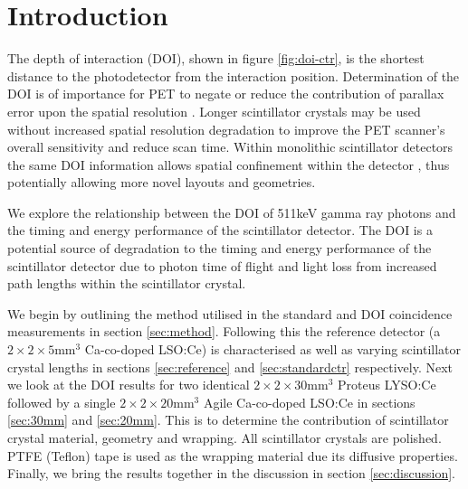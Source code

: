 \section{Introduction} 
The depth of interaction (DOI), shown in figure \ref{fig:doi-ctr}, is the shortest distance to the photodetector from the interaction position. Determination of the DOI is of importance for PET to negate or reduce the contribution of parallax error upon the spatial resolution \cite{Moses_2001}\cite{Humm_Rosenfeld_Del_Guerra_2003}. Longer scintillator crystals may be used without increased spatial resolution degradation to improve the PET scanner's overall sensitivity and reduce scan time. Within monolithic scintillator detectors the same DOI information allows spatial confinement within the detector \cite{am_Borghi_Seifert_Schaart_2013}\cite{Maas_Bruyndonckx_Schaart_2012}, thus potentially allowing more novel\cite{Dendooven_Lohner_Beekman_2009}\cite{n_der_Lei_van_Dam_Schaart_2013} layouts and geometries.

We explore the relationship between the DOI of 511keV gamma ray photons and the timing and energy performance of the scintillator detector. The DOI is a potential source of degradation to the timing and energy performance of the scintillator detector due to photon time of flight and light loss from increased path lengths within the scintillator crystal.

We begin by outlining the method utilised in the standard and DOI coincidence measurements in section \ref{sec:method}. Following this the reference detector (a $2\times2\times5$mm$^3$ Ca-co-doped LSO:Ce) is characterised as well as varying scintillator crystal lengths in sections \ref{sec:reference} and \ref{sec:standardctr} respectively. Next we look at the DOI results for two identical $2\times2\times30$mm$^3$ Proteus LYSO:Ce followed by a single $2\times2\times20$mm$^3$ Agile Ca-co-doped LSO:Ce in sections \ref{sec:30mm} and \ref{sec:20mm}. This is to determine the contribution of scintillator crystal material, geometry and wrapping. All scintillator crystals are polished. PTFE (Teflon) tape is used as the wrapping material due its diffusive properties. Finally, we bring the results together in the discussion in section \ref{sec:discussion}.
